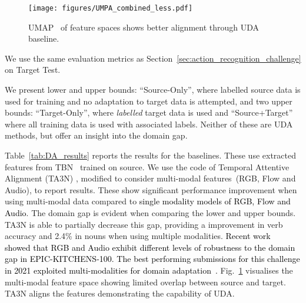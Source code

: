 \documentclass[twocolumn]{svjour3}          \smartqed
\newcommand{\chParagraph}[1]{\noindent {\textbf{#1.}} \hspace{6pt}}
\newcommand{\edits}[1]{\textcolor{black}{#1}}
\newcommand {\newDataset} {EPIC-KITCHENS-100}
\begin{document}
\begin{figure}[t!]
\centering
   \texttt{[image: figures/UMPA\_combined\_less.pdf]}
\caption{UMAP~\cite{mcinnes2018umap} of feature spaces shows better alignment through UDA baseline.}\label{fig:UD_visualisation}\end{figure}

\chParagraph{Evaluation}
We use the same evaluation metrics as Section~\ref{sec:action_recognition_challenge} on Target Test.

\chParagraph{Baselines and Results}
We present lower and upper bounds: ``Source-Only'', where labelled source data is used for training and no adaptation to target data is attempted, and two upper bounds: ``Target-Only'', where \textit{labelled} target data is used and ``Source+Target'' where all training data is used with associated labels. Neither of these are UDA methods, but offer an insight into the domain gap.

Table~\ref{tab:DA_results} reports the results for the baselines. These use extracted features from TBN~\cite{kazakos2019epic} trained on source.
We use the code of Temporal Attentive Alignment (TA3N) \cite{Chen2019}, modified to consider multi-modal features~(RGB, Flow and Audio), to report results. 
These show significant performance improvement when using multi-modal data compared to \edits{single modality models of RGB, Flow and Audio}.
The domain gap is evident when comparing the lower and upper bounds. TA3N is able to partially decrease this gap, providing a  improvement in verb accuracy and 2.4\% in nouns when using multiple modalities. 
\edits{Recent work~\cite{planamente2021cross} showed that RGB and Audio exhibit different levels of robustness to the domain gap in \newDataset. The best performing submissions for this challenge in 2021 exploited multi-modalities for domain adaptation~\cite{yang2021epic,plizzari2021polito}.} Fig.~\ref{fig:UD_visualisation} visualises the multi-modal feature space showing limited overlap between source and target. TA3N aligns the features demonstrating the capability of UDA. 
\end{document}
